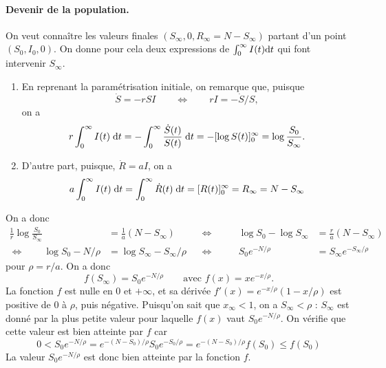 \paragraph*{Devenir de la population.}
On veut connaître les valeurs finales $(S_\infty, 0, R_\infty = N - S_\infty)$ partant d'un point $(S_0, I_0, 0)$. On donne pour cela deux expressions de $\int_0^\infty I(t) \text{d} t$ qui font intervenir $S_\infty$.
\begin{enumerate}
  \item En reprenant la paramétrisation initiale, on remarque que, puisque
  $$
  \dot S = - r S I \qquad \Leftrightarrow \qquad r I = - \dot S / S,
  $$
  on a
  $$
  r \int_0^\infty I(t) \; \text{d} t
  = - \int_0^\infty \frac{\dot S(t)}{S(t)} \; \text{d} t
  = - [\log S(t)]_0^\infty
  = \log \frac{S_0}{S_\infty}.
  $$
  \item D'autre part, puisque, $\dot R = aI$, on a
  $$
  a \int_0^\infty I(t) \; \text{d} t
  = \int_0^\infty \dot R(t) \; \text{d} t
  = [R(t)]_0^\infty
  = R_\infty = N - S_\infty
  $$
\end{enumerate}
On a donc
\begin{align*}
  \frac1r \log \frac{S_0}{S_\infty} & = \frac1a (N - S_\infty) & 
  & \Leftrightarrow \qquad & 
  \log {S_0} - \log {S_\infty} & = \frac{r}a (N - S_\infty) \\
  \Leftrightarrow \qquad
  \log S_0  - N / \rho & = \log S_\infty - S_\infty / \rho &
  & \Leftrightarrow \qquad &
  S_0 e^{- N / \rho}& = S_\infty e^{- S_\infty/\rho} 
\end{align*}
pour $\rho = r/a$. On a donc
$$
f(S_\infty) = S_0 e^{- N / \rho}
\qquad \text{avec } f(x) = x e^{-x/\rho}.
$$
La fonction $f$ est nulle en 0 et $+\infty$, et sa dérivée $f'(x) = e^{-x/\rho}(1 - x/\rho)$ est positive de 0 à $\rho$, puis négative.
Puisqu'on sait que $x_\infty  < 1$, on a $S_\infty < \rho$ : $S_\infty$ est donné par la plus petite valeur pour laquelle $f(x)$ vaut $S_0 e^{- N / \rho}$.
On vérifie que cette valeur est bien atteinte par $f$ car
$$
0 
< S_0 e^{-N/\rho} 
= e^{-(N - S_0)/\rho} S_0 e^{-S_0 / \rho}  = e^{-(N - S_0)/\rho} f(S_0) \leq f(S_0)
$$
La valeur $S_0 e^{-N/\rho}$ est donc bien atteinte par la fonction $f$.

